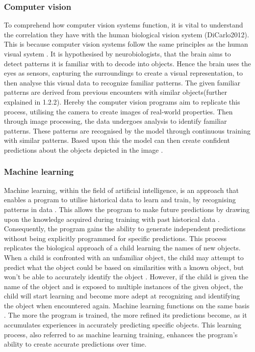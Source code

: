 \subsubsection{Computer vision}
To comprehend how computer vision systems function, it is vital to understand the correlation they have with the human biological vision system (DiCarlo2012). This is because computer vision systems follow the same principles as the human visual system \parencite[pp.~1--3]{Voulodimos2018}. It is hypothesised by neurobiologists, that the brain aims to detect patterns it is familiar with to decode into objects. Hence the brain uses the eyes as sensors, capturing the surroundings to create a visual representation, to then analyse this visual data to recognize familiar patterns. The given familiar patterns are derived from previous encounters with similar objects(further explained in 1.2.2). Hereby the computer vision programs aim to replicate this process, utilising the camera to create images of real-world properties. Then through image processing, the data undergoes analysis to identify familiar patterns. These patterns are recognised by the model through continuous training with similar patterns. Based upon this the model can then create confident predictions about the objects depicted in the image \parencite[pp.~1--7]{Jahne2000}. 

\subsubsection{Machine learning }
Machine learning, within the field of artificial intelligence, is an approach that enables a program to utilise historical data to learn and train, by recognising patterns in data  \parencite[pp.~2--4]{Zhou2021}. This allows the program to make future predictions by drawing upon the knowledge acquired during training with past historical data \parencite[pp.~6--10]{Mitchell1983}. Consequently, the program gains the ability to generate independent predictions without being explicitly programmed for specific predictions. This process replicates the biological approach of a child learning the names of new objects. When a child is confronted with an unfamiliar object, the child may attempt to predict what the object could be based on similarities with a known object, but won't be able to accurately identify the object \parencite[pp.~6--10]{Harrington2012}. However,  if the child is given the name of the object and is exposed to multiple instances of the given object, the child will start learning and become more adept at recognizing and identifying the object when encountered again. Machine learning functions on the same basis \parencite[p.~16]{Gollapudi2016}. The more the program is trained, the more refined its predictions become, as it accumulates experiences in accurately predicting specific objects. This learning process, also referred to as machine learning training, enhances the program's ability to create accurate predictions over time. 

